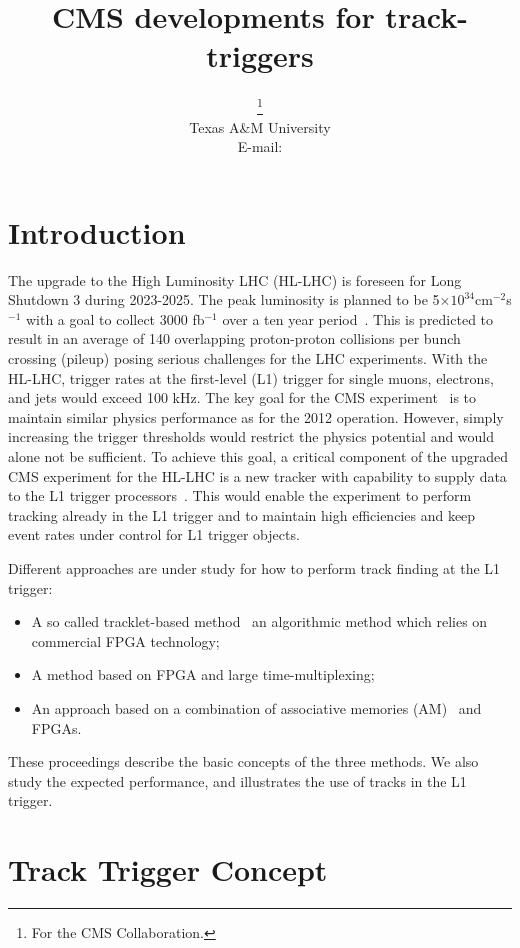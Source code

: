 \documentclass{PoS}
\title{CMS developments for track-triggers}
\author{\speaker{Marco De Mattia}%
        \thanks{For the CMS Collaboration.}\\
       Texas A\&M University\\
       E-mail: \email{marco.de.mattia@cern.ch}}
\begin{document}
\section{Introduction}

The upgrade to the High Luminosity LHC (HL-LHC) is foreseen for Long Shutdown 3 during 2023-2025. The peak luminosity is planned to be 5$\times10^{34}$cm$^{−2}$s$^{−1}$ with a goal to collect 3000 fb$^{−1}$ over a ten year period~\cite{SLHC}. This is predicted to result in an average of 140 overlapping proton-proton collisions per bunch crossing (pileup) posing serious challenges for the LHC experiments. With the HL-LHC, trigger rates at the first-level (L1) trigger for single muons, electrons, and jets would exceed 100 kHz. The key goal for the CMS experiment~\cite{CMS} is to maintain similar physics performance as for the 2012 operation. However, simply increasing the trigger thresholds would restrict the physics potential and would alone not be sufficient. To achieve this goal, a critical component of the upgraded CMS experiment for the HL-LHC is a new tracker with capability to supply data to the L1 trigger processors~\cite{CMSUpgrade}. This would enable the experiment to perform tracking already in the L1 trigger and to maintain high efficiencies and keep event rates under control for L1 trigger objects.

Different approaches are under study for how to perform track finding at the L1 trigger:
\begin{itemize}
\item A so called tracklet-based method~\cite{Tracklet} an algorithmic method which relies on commercial FPGA technology;
\item A method based on FPGA and large time-multiplexing;
\item An approach based on a combination of associative memories (AM)~\cite{AM} and FPGAs.
\end{itemize}
These proceedings describe the basic concepts of the three methods. We also study the expected performance, and illustrates the use of tracks in the L1 trigger.

\section{Track Trigger Concept}
\end{document}
